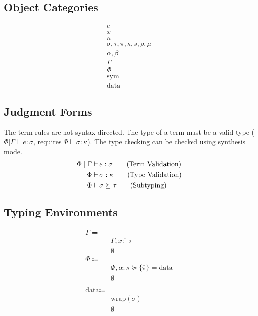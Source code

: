\documentclass {article}
\begin{document}
\subsection{Object Categories}

\begin{align*}
e \tag{Terms} \\
x \tag{Variables} \\
n \tag{Numbers} \\
\sigma, \tau, \pi, \kappa, s, \rho, \mu \tag{Types, Kinds, and Sorts} \\
\alpha, \beta \tag{Type and Kind Variables} \\
\Gamma \tag{Type Environment} \\
\Phi \tag{Misc Environment} \\
\text{sym} \tag{Symbol} \\
\text{data} \tag{NewType}
\end{align*}


\subsection{Judgment Forms}
The term rules are not syntax directed.
The type of a term must be a valid type ($ \Phi | \Gamma \vdash e : \sigma $, requires $ \Phi \vdash \sigma : \kappa $).
The type checking can be checked using synthesis mode.
\begin{align*}
\Phi \mid \Gamma \vdash \, & e : \sigma \tag{\text{Term Validation}} \\
\Phi \vdash \, & \sigma : \kappa \tag{\text{Type Validation}} \\
\Phi \vdash \, & \sigma \succeq \tau \tag{Subtyping}
\end{align*}

\subsection{Typing Environments}
\begin{align*}
\Gamma \Coloneqq & \\
& \Gamma, x :^\pi \sigma \\
& \emptyset \\
\Phi \Coloneqq & \\
& \Phi, \alpha : \kappa \succeq \{ \overline \pi \} = \text{data} \\
& \emptyset \\
\\
\text{data} \Coloneqq & \\
& \text{wrap} (\sigma) \\
& \emptyset
\end{align*}
\end{document}
